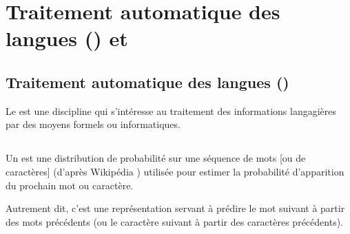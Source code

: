 

\section{Traitement automatique des langues () et }
\subsection{Traitement automatique des langues ()}
\label{subsec:nlp}\label{def:nlp}
Le  est une discipline qui s'intéresse au traitement des informations langagières par des moyens formels ou informatiques.

\subsection{}
Un  est une \og distribution de probabilité sur une séquence de mots [ou de caractères]\fg{} (d'après Wikipédia \autocite{wiki_lm})
utilisée pour estimer la probabilité d'apparition du prochain mot ou caractère.

Autrement dit, c'est une représentation servant à prédire le mot suivant à partir des mots précédents (ou le caractère suivant à partir des caractères précédents).

\pagebreak
